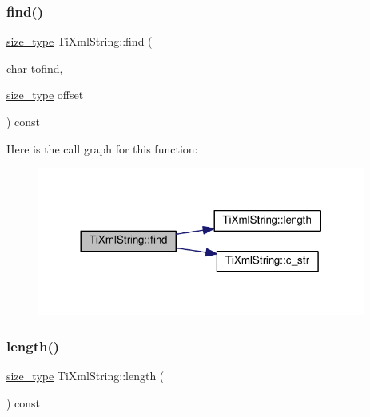 \mbox{\label{class_ti_xml_string_a2d66cfd6986faceda62ca62db553a921}} 
\subsubsection{\texorpdfstring{find()}{find()}\hspace{0.1cm}{\footnotesize\ttfamily [2/2]}}
{\footnotesize\ttfamily \hyperlink{class_ti_xml_string_abeb2c1893a04c17904f7c06546d0b971}{size\+\_\+type} Ti\+Xml\+String\+::find (\begin{DoxyParamCaption}\item[{char}]{tofind,  }\item[{\hyperlink{class_ti_xml_string_abeb2c1893a04c17904f7c06546d0b971}{size\+\_\+type}}]{offset }\end{DoxyParamCaption}) const\hspace{0.3cm}{\ttfamily [inline]}}

Here is the call graph for this function\+:
\nopagebreak
\begin{figure}[H]
\begin{center}
\leavevmode
\includegraphics[width=305pt]{class_ti_xml_string_a2d66cfd6986faceda62ca62db553a921_cgraph}
\end{center}
\end{figure}
\mbox{\label{class_ti_xml_string_a5db17f8314ffe2a89df0f0eb6c2a4bf5}} 
\subsubsection{\texorpdfstring{length()}{length()}}
{\footnotesize\ttfamily \hyperlink{class_ti_xml_string_abeb2c1893a04c17904f7c06546d0b971}{size\+\_\+type} Ti\+Xml\+String\+::length (\begin{DoxyParamCaption}{ }\end{DoxyParamCaption}) const\hspace{0.3cm}{\ttfamily [inline]}}

